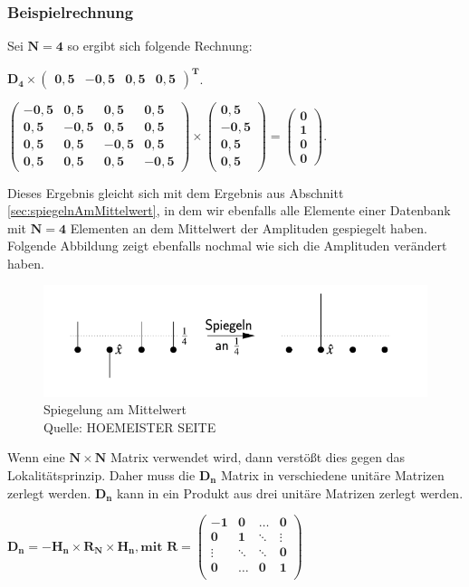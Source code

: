 \subsubsection{Beispielrechnung}
Sei $\mathbf{N = 4}$ so ergibt sich folgende Rechnung:
\begin{center}
 $\mathbf{D_4  \times \begin{pmatrix}
		0,5 & -0,5 & 0,5 & 0,5
\end{pmatrix}^T}$.

$\mathbf{\begin{pmatrix}
		-0,5 & 0,5 &0,5&0,5\\
		0,5 & -0,5 &0,5&0,5\\
		0,5 & 0,5 &-0,5&0,5\\
		0,5 & 0,5 &0,5&-0,5
	\end{pmatrix}
	\times \begin{pmatrix} 0,5 \\ -0,5 \\ 0,5 \\ 0,5 \end{pmatrix} = \begin{pmatrix} 0\\1\\0\\0 \end{pmatrix}
}$.
\end{center}
Dieses Ergebnis gleicht sich mit dem Ergebnis aus Abschnitt \ref{sec:spiegelnAmMittelwert}, in dem wir ebenfalls alle Elemente einer Datenbank mit $\mathbf{N=4}$ Elementen an dem Mittelwert der Amplituden gespiegelt haben. Folgende Abbildung zeigt ebenfalls nochmal wie sich die Amplituden verändert haben.
\begin{figure}[hbtp]
	\centering
	\includegraphics[width=.8\textwidth]{figures/spiegelung.png}
	\caption{Spiegelung am Mittelwert \\ Quelle: HOEMEISTER SEITE}
	\label{fig:spiegelung}
\end{figure}
Wenn eine $\mathbf{N \times N}$ Matrix verwendet wird, dann verstößt dies gegen das Lokalitätsprinzip. Daher muss die $\mathbf{D_n}$ Matrix in verschiedene unitäre Matrizen zerlegt werden.  $\mathbf{D_n}$ kann in ein Produkt aus drei unitäre Matrizen zerlegt werden.
\begin{center}
$\mathbf{D_n = -H_n \times R_N \times H_n, \text{mit } R  = 
\begin{pmatrix}
		-1 & 0 &\dots& 0 \\
		0& 1& \ddots& \vdots\\
		\vdots &\ddots& \ddots&0 \\
		0& \dots& 0 &1 \\
\end{pmatrix}}$
\end{center}
